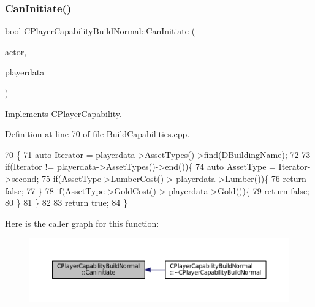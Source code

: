 \subsubsection{\texorpdfstring{Can\+Initiate()}{CanInitiate()}}
{\footnotesize\ttfamily bool C\+Player\+Capability\+Build\+Normal\+::\+Can\+Initiate (\begin{DoxyParamCaption}\item[{std\+::shared\+\_\+ptr$<$ \hyperlink{classCPlayerAsset}{C\+Player\+Asset} $>$}]{actor,  }\item[{std\+::shared\+\_\+ptr$<$ \hyperlink{classCPlayerData}{C\+Player\+Data} $>$}]{playerdata }\end{DoxyParamCaption})\hspace{0.3cm}{\ttfamily [virtual]}}



Implements \hyperlink{classCPlayerCapability_aa83b1e1fcaff2985c378132d679154ea}{C\+Player\+Capability}.



Definition at line 70 of file Build\+Capabilities.\+cpp.


\begin{DoxyCode}
70                                                                                                            
                     \{
71     \textcolor{keyword}{auto} Iterator = playerdata->AssetTypes()->find(\hyperlink{classCPlayerCapabilityBuildNormal_aae09d6cee5f8e201a0139c9065a5577c}{DBuildingName});
72     
73     \textcolor{keywordflow}{if}(Iterator != playerdata->AssetTypes()->end())\{
74         \textcolor{keyword}{auto} AssetType = Iterator->second;
75         \textcolor{keywordflow}{if}(AssetType->LumberCost() > playerdata->Lumber())\{
76             \textcolor{keywordflow}{return} \textcolor{keyword}{false};   
77         \}
78         \textcolor{keywordflow}{if}(AssetType->GoldCost() > playerdata->Gold())\{
79             \textcolor{keywordflow}{return} \textcolor{keyword}{false};   
80         \}
81     \}
82     
83     \textcolor{keywordflow}{return} \textcolor{keyword}{true};
84 \}
\end{DoxyCode}
Here is the caller graph for this function\+:\nopagebreak
\begin{figure}[H]
\begin{center}
\leavevmode
\includegraphics[width=350pt]{classCPlayerCapabilityBuildNormal_a5487e5521779846198604e8ebadaf283_icgraph}
\end{center}
\end{figure}


